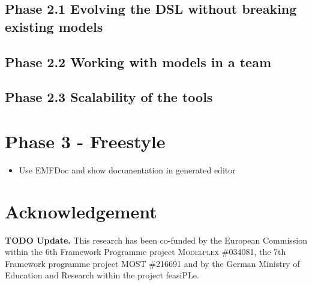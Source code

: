 \documentclass[10pt, pdftex]{llncs}
\newcommand{\todo}[1]{\color{red}\textbf{TODO #1}\color{black}}
\begin{document}
\subsection{Phase 2.1 Evolving the DSL without breaking existing models}

\subsection{Phase 2.2 Working with models in a team}

\subsection{Phase 2.3 Scalability of the tools}

\section{Phase 3 - Freestyle}

\begin{itemize}
  \item Use EMFDoc and show documentation in generated editor
\end{itemize}

\section*{Acknowledgement}
\small
	\todo{Update.}
    This research has been co-funded by the European Commission within the 6th Framework Programme project
    \textsc{Modelplex} \#034081, the 7th Framework programme project
    \textsc{MOST} \#216691 and by the German Ministry of Education and Research
    within the project feasiPLe.



\end{document}
